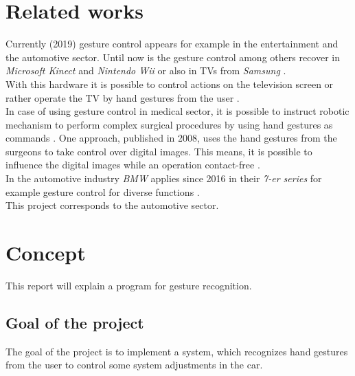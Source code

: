 \section{Related works}
\label{sec:relatedworks}

Currently (2019) gesture control appears for example in the entertainment and the automotive sector. Until now is the gesture control among others recover in \textit{Microsoft Kinect} and \textit{Nintendo Wii} or also in TVs from \textit{Samsung} \cite{Courtney2019}.\\
With this hardware it is possible to control actions on the television screen or rather operate the TV by hand gestures from the user \cite{Courtney2019}.\\
In case of using gesture control in medical sector, it is possible to instruct robotic mechanism to perform complex surgical procedures by using hand gestures as commands \cite{medical1}. One approach, published in 2008, uses the hand gestures from the surgeons to take control over digital images. This means, it is possible to influence the digital images while an operation contact-free \cite{wachs2008gesture}.\\
In the automotive industry \textit{BMW} applies since 2016 in their \textit{7-er series} for example gesture control for diverse functions \cite{Courtney2019}.\\
This project corresponds to the automotive sector.



\section{Concept}
\label{sec:concept}
This report will explain a program for gesture recognition.

\subsection{Goal of the project}
\label{subsec:goal}
The goal of the project is to implement a system, which recognizes hand gestures from the user to control some system adjustments in the car.

